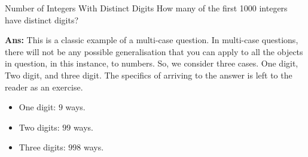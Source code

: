 \begin{exampletcb}
    {Number of Integers With Distinct Digits}{}
    How many of the first 1000 integers have distinct digits?

    \textbf{Ans:} This is a classic example of a multi-case question. In multi-case questions, there will not be any possible generalisation that you can apply to all the objects in question, in this instance, to numbers. So, we consider three cases. One digit, Two digit, and three digit. The specifics of arriving to the answer is left to the reader as an exercise.
    \begin{itemize}
        \item One digit: \mbox{$\boxed{9}$} ways.
        \item Two digits: \mbox{$\boxed{9}\boxed{9}$} ways. 
        \item Three digits: \mbox{$\boxed{9}\boxed{9}\boxed{8}$} ways.
    \end{itemize}
\end{exampletcb}


